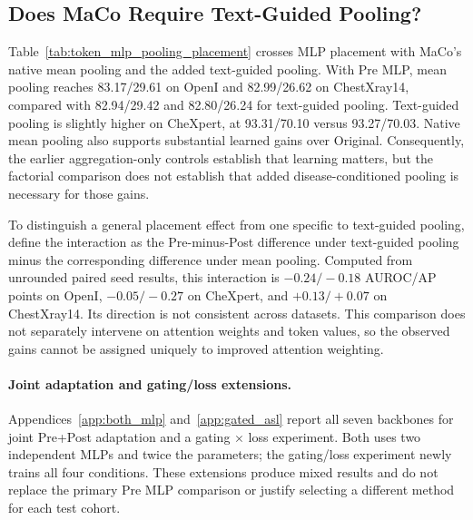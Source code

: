 \subsection{Does MaCo Require Text-Guided Pooling?}
\label{sec:pooling_placement_results}

Table~\ref{tab:token_mlp_pooling_placement} crosses MLP placement with MaCo's native mean pooling and the added text-guided pooling. With Pre MLP, mean pooling reaches 83.17/29.61 on OpenI and 82.99/26.62 on ChestXray14, compared with 82.94/29.42 and 82.80/26.24 for text-guided pooling. Text-guided pooling is slightly higher on CheXpert, at 93.31/70.10 versus 93.27/70.03. Native mean pooling also supports substantial learned gains over Original. Consequently, the earlier aggregation-only controls establish that learning matters, but the factorial comparison does not establish that added disease-conditioned pooling is necessary for those gains.

To distinguish a general placement effect from one specific to text-guided pooling, define the interaction as the Pre-minus-Post difference under text-guided pooling minus the corresponding difference under mean pooling. Computed from unrounded paired seed results, this interaction is $-0.24/-0.18$ AUROC/AP points on OpenI, $-0.05/-0.27$ on CheXpert, and $+0.13/+0.07$ on ChestXray14. Its direction is not consistent across datasets. This comparison does not separately intervene on attention weights and token values, so the observed gains cannot be assigned uniquely to improved attention weighting.

\paragraph{Joint adaptation and gating/loss extensions.}
Appendices~\ref{app:both_mlp} and~\ref{app:gated_asl} report all seven backbones for joint Pre+Post adaptation and a gating $\times$ loss experiment. Both uses two independent MLPs and twice the parameters; the gating/loss experiment newly trains all four conditions. These extensions produce mixed results and do not replace the primary Pre MLP comparison or justify selecting a different method for each test cohort.
